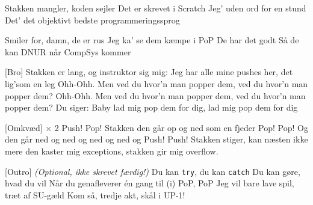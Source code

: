 \documentclass{article}
\begin{document}
\begin{song}
Stakken mangler, koden sejler
Det er skrevet i Scratch
Jeg' uden ord for en stund
%
Det' det objektivt bedste programmeringssprog

%
Smiler for, damn, de er rus
Jeg ka' se dem kæmpe i PoP
De har det godt
Så de kan DNUR når CompSys kommer

[Bro]
%
Stakken er lang, og instruktor sig mig:
Jeg har alle mine pushes her, det lig'som en leg
Ohh-Ohh.
Men ved du hvor'n man popper dem, ved du hvor'n man popper dem?
Ohh-Ohh.
Men ved du hvor'n man popper dem, ved du hvor'n man popper dem?
Du siger:
%
Baby lad mig pop dem for dig, lad mig pop dem for dig

[Omkvæd] $\times$ 2
%
Push! Pop! Stakken den går op og ned som en fjeder
Pop! Pop! Og den går ned og ned og ned og ned og
Push! Push! Stakken stiger, kan næsten ikke mere
%
den kaster mig exceptions, stakken gir mig overflow.

[Outro] \textit{(Optional, ikke skrevet færdig!)}
%
    Du kan \texttt{try}, du kan \texttt{catch}
    Du kan gøre, hvad du vil
    Når du genafleverer én gang til (i)
    PoP, PoP
%
    Jeg vil bare lave spil, træt af SU-gæld
%
    Kom så, tredje akt, skål i UP-1!

\end{song}

\end{document}
